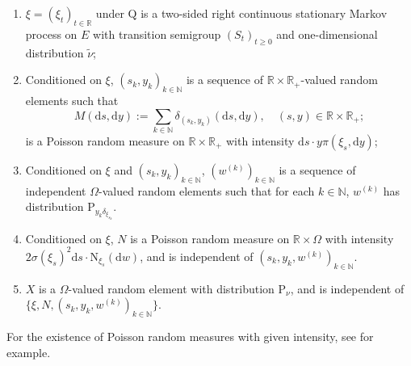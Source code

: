\documentclass[12pt,a4paper]{amsart}
\numberwithin{equation}{section}
\theoremstyle{plain}
\theoremstyle{definition}
\theoremstyle{remark}
\begin{document}
\begin{enumerate}[label=(Q\arabic*),ref=Q\arabic*]
\item \label{asp:Q2}
	$\xi = (\xi_t)_{t\in \mathbb R}$ under $\mathrm Q$ is a two-sided right continuous stationary Markov process on $E$ with transition semigroup $(S_t)_{t\geq 0}$ and one-dimensional distribution $\widetilde \nu$;
\item \label{asp:Q4}
	Conditioned on $\xi$, $(s_k, y_k)_{k\in \mathbb N}$ is a sequence of $\mathbb R \times \mathbb R_+$-valued random elements
	such that
	\[
	M(\mathrm ds,\mathrm dy)
	:= \sum_{k\in \mathbb N} \delta_{(s_k, y_k)}(\mathrm ds,\mathrm dy), \quad (s,y)\in \mathbb R \times \mathbb R_+;
	\]	
	is a Poisson random measure on $\mathbb R \times \mathbb R_+$ with intensity $\mathrm ds \cdot y \pi(\xi_s, \mathrm dy)$;
\item \label{asp:Q5}
	Conditioned on $\xi$ and $(s_k, y_k)_{k\in \mathbb N}$, $(w^{(k)})_{k\in \mathbb N}$ is a sequence of independent $\Omega$-valued random elements such that for each $k\in \mathbb N$, $w^{(k)}$ has distribution $\mathrm P_{y_k\delta_{\xi_{s_k}}}$.
\item \label{asp:Q3}
	Conditioned on $\xi$, $N$ is a Poisson random measure on $\mathbb R\times \Omega$ with intensity $2 \sigma(\xi_s)^2 {\mathrm d}s \cdot \mathrm N_{\xi_s}({\mathrm d}w)$, and is independent of $(s_k, y_k, w^{(k)})_{k\in \mathbb N}$.
\item \label{asp:Q1}
	$X$ is a $\Omega$-valued random element with distribution $\mathrm P_\nu$, and is independent of $\{\xi, N, (s_k, y_k, w^{(k)})_{k\in \mathbb N}\}$.
\end{enumerate}
	For the existence of Poisson random measures with given intensity, see \cite[Theorem 2.4]{Kyprianou2014Fluctuations} for example.
	
\end{document}

